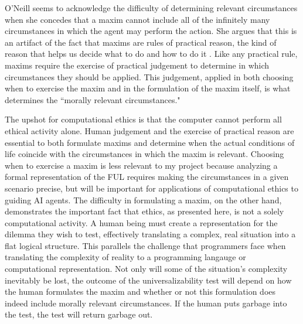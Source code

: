 \begin{isabellebody}
\begin{isamarkuptext}
O'Neill seems to acknowledge the difficulty of determining relevant circumstances when she concedes that a maxim cannot include all 
of the infinitely many circumstances in which the agent may perform the action\cite[4:428]{actingonprinciple}. She argues that this is 
an artifact of the fact that maxims are rules of practical reason, the kind of reason that helps us decide what to do 
and how to do it \cite{bok}. Like any practical rule, 
maxims require the exercise of practical judgement to determine in which circumstances they should be applied. 
This judgement, applied in both choosing when to exercise the maxim and in the formulation of the maxim 
itself, is what determines the ``morally relevant circumstances."

The upshot for computational ethics is that the computer cannot perform all ethical activity alone. 
Human judgement and the exercise of practical reason are essential to both formulate maxims and 
determine when the actual conditions of life coincide with the circumstances in which the maxim is relevant. 
Choosing when to exercise a maxim is less relevant to my project because analyzing a formal representation of the FUL requires 
making the circumstances in a given scenario precise, but will be important for applications of 
computational ethics to guiding AI agents. The difficulty in formulating a maxim, on the other hand, demonstrates 
the important fact that ethics, as presented here, is not a solely computational activity. A
human being must create a representation for the dilemma they wish to test, effectively translating 
a complex, real situation into a flat logical structure. This parallels the challenge that programmers 
face when translating the complexity of reality to a programming langauge or computational representation. Not only will some of the situation's complexity
inevitably be lost, the outcome of the universalizability test will depend on how the human formulates the maxim
and whether or not this formulation does indeed include morally relevant circumstances. If the human puts 
garbage into the test, the test will return garbage out.


\end{isamarkuptext}
\end{isabellebody}
